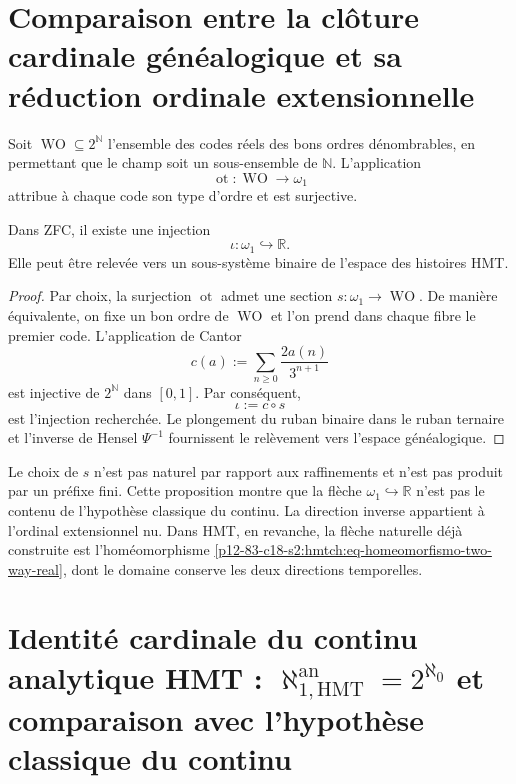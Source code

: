 \section{Comparaison entre la clôture cardinale généalogique et sa réduction ordinale extensionnelle}

Soit \(\operatorname{WO}\subseteq2^{\mathbb N}\) l'ensemble des codes
réels des bons ordres dénombrables, en permettant que le champ soit un
sous-ensemble de \(\mathbb N\). L'application
\[
 \operatorname{ot}:\operatorname{WO}\longrightarrow\omega_1
\]
attribue à chaque code son type d'ordre et est surjective.

\begin{proposition}
\label{p12-83-c19-s1:hmtch:prop-omega1-en-reales}
Dans ZFC, il existe une injection
\[
 \iota:\omega_1\hookrightarrow\mathbb R.
\]
Elle peut être relevée vers un sous-système binaire de l'espace des histoires HMT.
\end{proposition}

\begin{proof}
Par choix, la surjection \(\operatorname{ot}\) admet une section
\(s:\omega_1\to\operatorname{WO}\). De manière équivalente, on fixe un bon
ordre de \(\operatorname{WO}\) et l'on prend dans chaque fibre le premier code.
L'application de Cantor
\[
 c(a):=\sum_{n\geq0}\frac{2a(n)}{3^{n+1}}
\]
est injective de \(2^{\mathbb N}\) dans \([0,1]\). Par conséquent,
\[
 \iota:=c\circ s
\]
est l'injection recherchée. Le plongement du ruban binaire dans le ruban
ternaire et l'inverse de Hensel \(\Psi^{-1}\) fournissent le relèvement vers
l'espace généalogique.
\end{proof}

Le choix de \(s\) n'est pas naturel par rapport aux raffinements et n'est pas
produit par un préfixe fini. Cette proposition montre que la flèche
\(\omega_1\hookrightarrow\mathbb R\) n'est pas le contenu de l'hypothèse
classique du continu. La direction inverse appartient à l'ordinal extensionnel
nu. Dans HMT, en revanche, la flèche naturelle déjà construite est
l'homéomorphisme \eqref{p12-83-c18-s2:hmtch:eq-homeomorfismo-two-way-real}, dont le domaine
conserve les deux directions temporelles.

\section{Identité cardinale du continu analytique HMT : \(\aleph_{1,\mathrm{HMT}}^{\mathrm{an}}=2^{\aleph_0}\) et comparaison avec l'hypothèse classique du continu}

